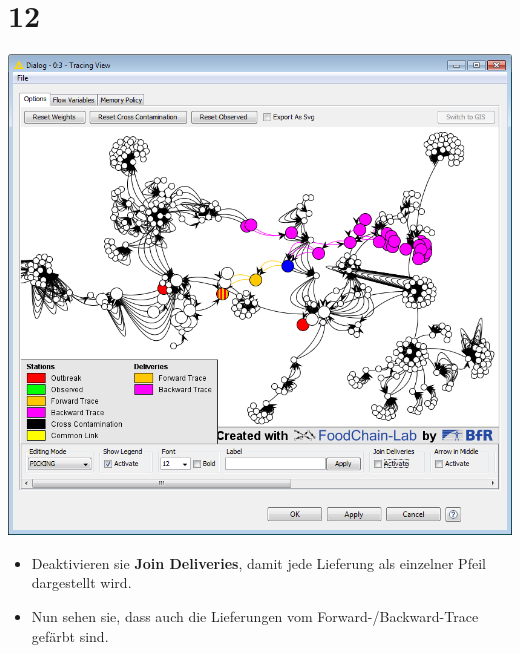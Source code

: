 \documentclass{beamer}
\begin{document}
\section{12}
\begin{frame}
	\begin{center}
  		\includegraphics[height=0.6\textheight]{12.png}
	\end{center}
	\begin{itemize}
		\item Deaktivieren sie \textbf{Join Deliveries}, damit jede Lieferung als einzelner Pfeil dargestellt wird.
		\item Nun sehen sie, dass auch die Lieferungen vom Forward-/Backward-Trace gefärbt sind.
	\end{itemize}
\end{frame}
\end{document}
